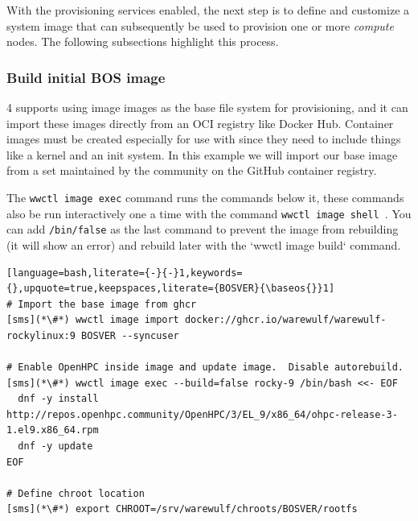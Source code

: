 With the provisioning services enabled, the next step is to define and
customize a system image that can subsequently be used to provision one or more
{\em compute} nodes. The following subsections highlight this process.

\subsubsection{Build initial BOS image} \label{sec:assemble_bos}
\Warewulf{} 4 supports using image images as the base file system for
provisioning, and it can import these images directly from an OCI registry like
Docker Hub. Container images must be created especially for use with \Warewulf{}
since they need to include things like a kernel and an init system. In this
example we will import our base image from a set maintained by the \Warewulf{}
community on the GitHub container registry.

The \texttt{wwctl image exec} command runs the commands below it, these commands
also be run interactively one a time with the command \texttt{wwctl image
shell \baseos{}}. You can add \texttt{/bin/false} as the last command to prevent
the image from rebuilding (it will show an error) and rebuild later with the
`wwctl image build` command.

\begin{lstlisting}[language=bash,literate={-}{-}1,keywords={},upquote=true,keepspaces,literate={BOSVER}{\baseos{}}1]
# Import the base image from ghcr
[sms](*\#*) wwctl image import docker://ghcr.io/warewulf/warewulf-rockylinux:9 BOSVER --syncuser

# Enable OpenHPC inside image and update image.  Disable autorebuild.
[sms](*\#*) wwctl image exec --build=false rocky-9 /bin/bash <<- EOF
  dnf -y install http://repos.openhpc.community/OpenHPC/3/EL_9/x86_64/ohpc-release-3-1.el9.x86_64.rpm
  dnf -y update
EOF

# Define chroot location
[sms](*\#*) export CHROOT=/srv/warewulf/chroots/BOSVER/rootfs
\end{lstlisting}
